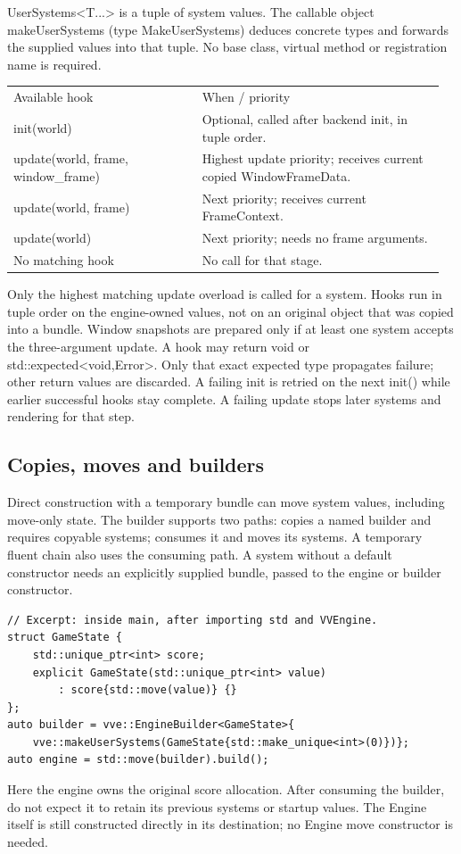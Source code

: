\documentclass[11pt,a4paper]{article}
\begin{document}
UserSystems<T...> is a tuple of system values. The callable object makeUserSystems (type MakeUserSystems) deduces concrete types and forwards the supplied values into that tuple. No base class, virtual method or registration name is required.

{\small
\begin{longtable}{@{}p{0.42\linewidth}p{0.54\linewidth}@{}}
Available hook & When / priority \\
init(world) & Optional, called after backend init, in tuple order. \\
update(world, frame, window\_frame) & Highest update priority; receives current copied WindowFrameData. \\
update(world, frame) & Next priority; receives current FrameContext. \\
update(world) & Next priority; needs no frame arguments. \\
No matching hook & No call for that stage. \\
\end{longtable}
}

Only the highest matching update overload is called for a system. Hooks run in tuple order on the engine-owned values, not on an original object that was copied into a bundle. Window snapshots are prepared only if at least one system accepts the three-argument update. A hook may return void or std::expected<void,Error>. Only that exact expected type propagates failure; other return values are discarded. A failing init is retried on the next init() while earlier successful hooks stay complete. A failing update stops later systems and rendering for that step.

\clearpage
\subsection*{Copies, moves and builders}
Direct construction with a temporary bundle can move system values, including move-only state. The builder supports two paths:  copies a named builder and requires copyable systems;  consumes it and moves its systems. A temporary fluent chain also uses the consuming path. A system without a default constructor needs an explicitly supplied  bundle, passed to the engine or builder constructor.

\begin{lstlisting}
// Excerpt: inside main, after importing std and VVEngine.
struct GameState {
    std::unique_ptr<int> score;
    explicit GameState(std::unique_ptr<int> value)
        : score{std::move(value)} {}
};
auto builder = vve::EngineBuilder<GameState>{
    vve::makeUserSystems(GameState{std::make_unique<int>(0)})};
auto engine = std::move(builder).build();
\end{lstlisting}
Here the engine owns the original score allocation. After consuming the builder, do not expect it to retain its previous systems or startup values. The Engine itself is still constructed directly in its destination; no Engine move constructor is needed.
\end{document}
